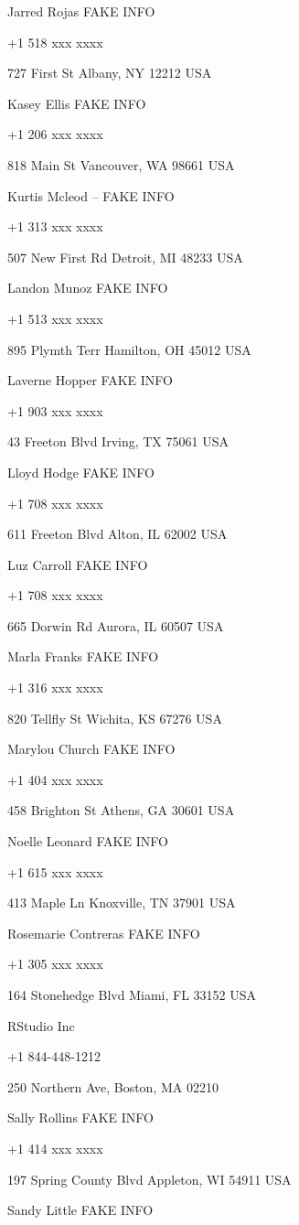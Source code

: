 \documentclass[]{book}
\theoremstyle{definition}
\theoremstyle{definition}
\theoremstyle{definition}
\theoremstyle{remark}
\begin{document}
Jarred Rojas FAKE INFO

+1 518 xxx xxxx

727 First St Albany, NY 12212 USA

Kasey Ellis FAKE INFO

+1 206 xxx xxxx

818 Main St Vancouver, WA 98661 USA

Kurtis Mcleod -- FAKE INFO

+1 313 xxx xxxx

507 New First Rd Detroit, MI 48233 USA

Landon Munoz FAKE INFO

+1 513 xxx xxxx

895 Plymth Terr Hamilton, OH 45012 USA

Laverne Hopper FAKE INFO

+1 903 xxx xxxx

43 Freeton Blvd Irving, TX 75061 USA

Lloyd Hodge FAKE INFO

+1 708 xxx xxxx

611 Freeton Blvd Alton, IL 62002 USA

Luz Carroll FAKE INFO

+1 708 xxx xxxx

665 Dorwin Rd Aurora, IL 60507 USA

Marla Franks FAKE INFO

+1 316 xxx xxxx

820 Tellfly St Wichita, KS 67276 USA

Marylou Church FAKE INFO

+1 404 xxx xxxx

458 Brighton St Athens, GA 30601 USA

Noelle Leonard FAKE INFO

+1 615 xxx xxxx

413 Maple Ln Knoxville, TN 37901 USA

Rosemarie Contreras FAKE INFO

+1 305 xxx xxxx

164 Stonehedge Blvd Miami, FL 33152 USA

RStudio Inc

+1 844-448-1212

250 Northern Ave, Boston, MA 02210

Sally Rollins FAKE INFO

+1 414 xxx xxxx

197 Spring County Blvd Appleton, WI 54911 USA

Sandy Little FAKE INFO
\end{document}
